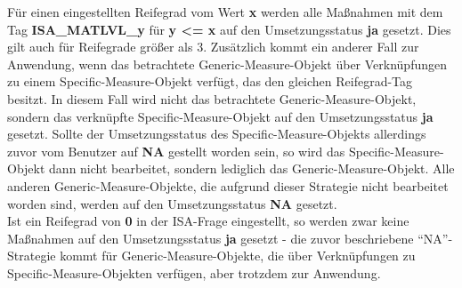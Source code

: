 \documentclass[a4paper,10pt]{book}
\begin{document}
Für einen eingestellten Reifegrad vom Wert \textbf{x} werden alle Maßnahmen mit dem Tag \textbf{ISA\_MATLVL\_y} für \textbf{y \textless= x} auf den Umsetzungsstatus \textbf{ja} gesetzt. Dies gilt auch für Reifegrade größer als 3.
Zusätzlich kommt ein anderer Fall zur Anwendung, wenn das betrachtete Generic-Measure-Objekt über Verknüpfungen zu einem Specific-Measure-Objekt verfügt, das den gleichen Reifegrad-Tag besitzt. In diesem Fall wird nicht das betrachtete Generic-Measure-Objekt, sondern das verknüpfte Specific-Measure-Objekt auf den Umsetzungsstatus \textbf{ja} gesetzt. Sollte der Umsetzungsstatus des Specific-Measure-Objekts allerdings zuvor vom Benutzer auf \textbf{NA} gestellt worden sein, so wird das Specific-Measure-Objekt dann nicht bearbeitet, sondern lediglich das Generic-Measure-Objekt. Alle anderen Generic-Measure-Objekte, die aufgrund dieser Strategie nicht bearbeitet worden sind, werden auf den Umsetzungsstatus \textbf{NA} gesetzt.
\newline\\
Ist ein Reifegrad von \textbf{0} in der ISA-Frage eingestellt, so werden zwar keine Maßnahmen auf den Umsetzungsstatus \textbf{ja} gesetzt - die zuvor beschriebene ``NA''-Strategie kommt für Generic-Measure-Objekte, die über Verknüpfungen zu Specific-Measure-Objekten verfügen, aber trotzdem zur Anwendung.
\end{document}
